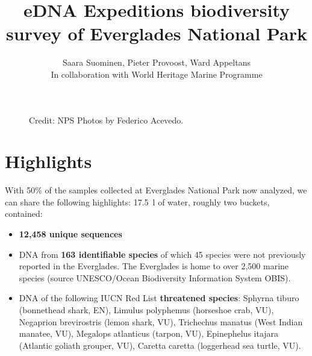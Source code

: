 \documentclass[10pt]{article}
\date{}
\title{eDNA Expeditions biodiversity survey of Everglades National Park}
\author{Saara Suominen, Pieter Provoost, Ward Appeltans\\In collaboration with World Heritage Marine Programme}
\begin{document}
\maketitle

\begin{figure}[h]
 	\centering
 	\caption*{Credit: NPS Photos by Federico Acevedo.}
\end{figure}

\section*{Highlights}

With 50\% of the samples collected at Everglades National Park now analyzed, we can share the following highlights: \SI{17.5}{\litre} of water, roughly two buckets, contained:

\begin{itemize}
\item \textbf{12,458 unique sequences}
\item DNA from \textbf{163 identifiable species} of which 45 species were not previously reported in the Everglades. The Everglades is home to over 2,500 marine species (source UNESCO/Ocean Biodiversity Information System OBIS).
\item DNA of the following IUCN Red List \textbf{threatened species}: Sphyrna tiburo (bonnethead shark, EN), Limulus polyphemus (horseshoe crab, VU), Negaprion brevirostris (lemon shark, VU), Trichechus manatus (West Indian manatee, VU), Megalops atlanticus (tarpon, VU), Epinephelus itajara (Atlantic goliath grouper, VU), Caretta caretta (loggerhead sea turtle, VU).
\end{itemize}
\end{document}
